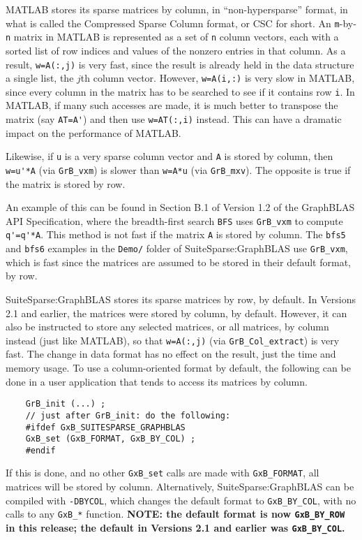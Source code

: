 \documentclass[12pt]{article}
\begin{document}
MATLAB stores its sparse matrices by column, in ``non-hypersparse'' format, in
what is called the Compressed Sparse Column format, or CSC for short.  An
\verb'm'-by-\verb'n' matrix in MATLAB is represented as a set of \verb'n'
column vectors, each with a sorted list of row indices and values of the
nonzero entries in that column.  As a result, \verb'w=A(:,j)' is very fast,
since the result is already held in the data structure a single list, the $j$th
column vector.  However, \verb'w=A(i,:)' is very slow in MATLAB, since every
column in the matrix has to be searched to see if it contains row \verb'i'.  In
MATLAB, if many such accesses are made, it is much better to transpose the
matrix (say \verb"AT=A'") and then use \verb"w=AT(:,i)" instead.  This can have
a dramatic impact on the performance of MATLAB.

Likewise, if \verb'u' is a very sparse column vector and \verb'A' is stored by
column, then \verb"w=u'*A" (via \verb'GrB_vxm') is slower than \verb'w=A*u'
(via \verb'GrB_mxv').  The opposite is true if the matrix is stored by row.

An example of this can be found in Section B.1 of Version 1.2 of the GraphBLAS
API Specification, where the breadth-first search \verb'BFS' uses
\verb'GrB_vxm' to compute \verb"q'=q'*A".  This method is not fast if the
matrix \verb'A' is stored by column.  The \verb'bfs5' and \verb'bfs6' examples
in the \verb'Demo/' folder of SuiteSparse:GraphBLAS use \verb'GrB_vxm',
which is fast since the matrices are assumed to be stored in their
default format, by row.

SuiteSparse:GraphBLAS stores its sparse matrices by row, by default.  In
Versions 2.1 and earlier, the matrices were stored by column, by default.
However, it can also be instructed to store any selected matrices, or all
matrices, by column instead (just like MATLAB), so that \verb'w=A(:,j)' (via
\verb'GrB_Col_extract') is very fast.  The change in data format has no effect
on the result, just the time and memory usage.  To use a column-oriented format
by default, the following can be done in a user application that tends to
access its matrices by column.

    {\footnotesize
    \begin{verbatim}
    GrB_init (...) ;
    // just after GrB_init: do the following:
    #ifdef GxB_SUITESPARSE_GRAPHBLAS
    GxB_set (GxB_FORMAT, GxB_BY_COL) ;
    #endif \end{verbatim} }

If this is done, and no other \verb'GxB_set' calls are made with
\verb'GxB_FORMAT', all matrices will be stored by column.  Alternatively,
SuiteSparse:GraphBLAS can be compiled with \verb'-DBYCOL', which changes the
default format to \verb'GxB_BY_COL', with no calls to any \verb'GxB_*'
function. {\bf NOTE: the default format is now \verb'GxB_BY_ROW' in this
release; the default in Versions 2.1 and earlier was \verb'GxB_BY_COL'.}
\end{document}
